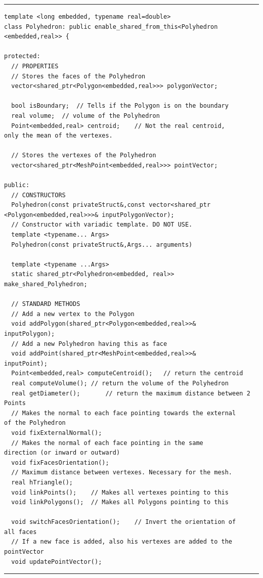 \noindent\rule{12.7cm}{1pt}
\begin{verbatim}
template <long embedded, typename real=double>
class Polyhedron: public enable_shared_from_this<Polyhedron
<embedded,real>> {

protected:
  // PROPERTIES
  // Stores the faces of the Polyhedron
  vector<shared_ptr<Polygon<embedded,real>>> polygonVector; 
	
  bool isBoundary;	// Tells if the Polygon is on the boundary
  real volume;	// volume of the Polyhedron
  Point<embedded,real> centroid;	// Not the real centroid, 
only the mean of the vertexes.

  // Stores the vertexes of the Polyhedron
  vector<shared_ptr<MeshPoint<embedded,real>>> pointVector;	

public:
  // CONSTRUCTORS
  Polyhedron(const privateStruct&,const vector<shared_ptr
<Polygon<embedded,real>>>& inputPolygonVector);
  // Constructor with variadic template. DO NOT USE.
  template <typename... Args>
  Polyhedron(const privateStruct&,Args... arguments)

  template <typename ...Args>
  static shared_ptr<Polyhedron<embedded, real>>
make_shared_Polyhedron;

  // STANDARD METHODS
  // Add a new vertex to the Polygon
  void addPolygon(shared_ptr<Polygon<embedded,real>>& 
inputPolygon);
  // Add a new Polyhedron having this as face
  void addPoint(shared_ptr<MeshPoint<embedded,real>>& 
inputPoint);
  Point<embedded,real> computeCentroid();	// return the centroid
  real computeVolume();	// return the volume of the Polyhedron
  real getDiameter();		// return the maximum distance between 2 
Points
  // Makes the normal to each face pointing towards the external
of the Polyhedron
  void fixExternalNormal();	
  // Makes the normal of each face pointing in the same 
direction (or inward or outward)
  void fixFacesOrientation();	
  // Maximum distance between vertexes. Necessary for the mesh.
  real hTriangle();	
  void linkPoints();	// Makes all vertexes pointing to this
  void linkPolygons();  // Makes all Polygons pointing to this

  void switchFacesOrientation();	// Invert the orientation of
all faces
  // If a new face is added, also his vertexes are added to the
pointVector
  void updatePointVector();
\end{verbatim}
\noindent\rule{12.7cm}{1pt}\\

